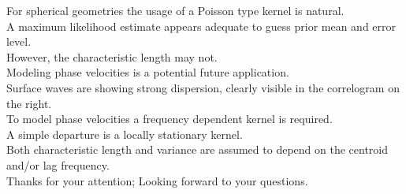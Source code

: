 \documentclass[aspectratio=169, t, 10pt, ]{beamer}
\begin{document}
For spherical geometries the usage of a Poisson type kernel is natural.
\\
A maximum likelihood estimate appears adequate to guess prior mean and error level.
\\
However, the characteristic length may not.
\\[2mm]

Modeling phase velocities is a potential future application.
\\
Surface waves are showing strong dispersion, clearly visible in the correlogram on the right.
\\
To model phase velocities a frequency dependent kernel is required.
\\
A simple departure is a locally stationary kernel.
\\
Both characteristic length and variance are assumed to depend on the centroid and/or lag frequency.
\\[2mm]

Thanks for your attention; Looking forward to your questions.
\end{document}
